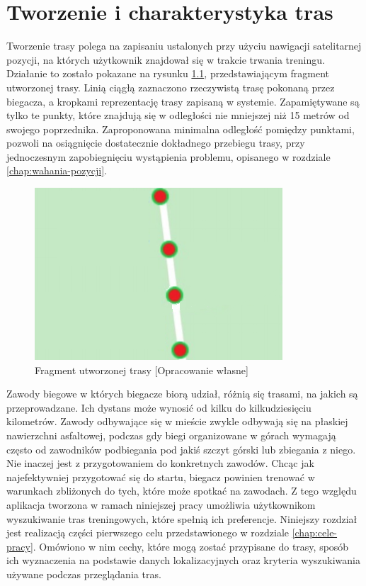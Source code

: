 \chapter{Tworzenie i charakterystyka tras}\label{chap:charakterystyka-tras}
Tworzenie trasy polega na zapisaniu ustalonych przy użyciu nawigacji satelitarnej pozycji, na których użytkownik znajdował się w trakcie trwania treningu. Działanie to zostało pokazane na rysunku \ref{image:mapka_fragment_trasy}, przedstawiającym fragment utworzonej trasy. Linią ciągłą zaznaczono rzeczywistą trasę pokonaną przez biegacza, a kropkami reprezentację trasy zapisaną w systemie. Zapamiętywane są tylko te punkty, które znajdują się w odległości nie mniejszej niż 15 metrów od swojego poprzednika. Zaproponowana minimalna odległość pomiędzy punktami, pozwoli na osiągnięcie dostatecznie dokładnego przebiegu trasy, przy jednoczesnym zapobiegnięciu wystąpienia problemu, opisanego w rozdziale \ref{chap:wahania-pozycji}.

\begin{figure}[h]
\begin{center}
\includegraphics{img/mapka_fragment_trasy.png}
\caption{Fragment utworzonej trasy [Opracowanie własne]}\label{image:mapka_fragment_trasy}
\end{center}
\end{figure}

Zawody biegowe w których biegacze biorą udział, różnią się trasami, na jakich są przeprowadzane. Ich dystans może wynosić od kilku do kilkudziesięciu kilometrów. Zawody odbywające się w mieście zwykle odbywają się na płaskiej nawierzchni asfaltowej, podczas gdy biegi organizowane w górach wymagają często od zawodników podbiegania pod jakiś szczyt górski lub zbiegania z niego. Nie inaczej jest z przygotowaniem do konkretnych zawodów. Chcąc jak najefektywniej przygotować się do startu, biegacz powinien trenować w warunkach zbliżonych do tych, które może spotkać na zawodach. Z tego względu aplikacja tworzona w ramach niniejszej pracy umożliwia użytkownikom wyszukiwanie tras treningowych, które spełnią ich preferencje. Niniejszy rozdział jest realizacją części pierwszego celu przedstawionego w rozdziale \ref{chap:cele-pracy}. Omówiono w nim cechy, które mogą zostać przypisane do trasy, sposób ich wyznaczenia na podstawie danych lokalizacyjnych oraz kryteria wyszukiwania używane podczas przeglądania tras. 
